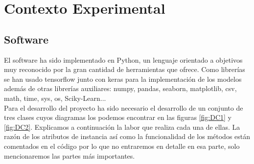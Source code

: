 



\chapter{Contexto Experimental}\label{ch:contexto_experimental}



\section{Software}

    El software ha sido implementado en Python, un lenguaje orientado a objetivos muy reconocido por la gran cantidad de herramientas que ofrece. Como librerías se han usado tensorflow junto con keras para la implementación de los modelos además de otras librerías auxiliares: numpy, pandas, seaborn, matplotlib, csv, math, time, sys, os, Sciky-Learn...\\
    
    Para el desarrollo del proyecto ha sido necesario el desarrollo de un conjunto de tres clases cuyos diagramas los podemos encontrar en las figuras \ref{fig:DC1} y \ref{fig:DC2}. Explicamos a continuación la labor que realiza cada una de ellas. La razón de los atributos de instancia así como la funcionalidad de los métodos están comentados en el código por lo que no entraremos en detalle en esa parte, solo mencionaremos las partes más importantes.\\
    
